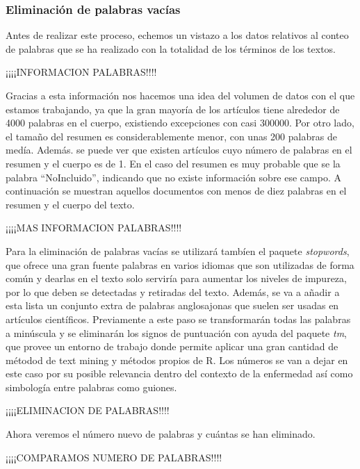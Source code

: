 \documentclass[10pt, a4paper]{article}
\begin{document}

\subsubsection{Eliminación de palabras vacías}

Antes de realizar este proceso, echemos un vistazo a los datos relativos al conteo de palabras que se ha realizado con la totalidad de los términos de los textos.

¡¡¡¡INFORMACION PALABRAS!!!!

Gracias a esta información nos hacemos una idea del volumen de datos con el que estamos trabajando, ya que la gran mayoría de los artículos tiene alrededor de 4000 palabras en el cuerpo, existiendo excepciones con casi 300000. Por otro lado, el tamaño del resumen es considerablemente menor, con unas 200 palabras de medía. Además. se puede ver que existen artículos cuyo número de palabras en el resumen y el cuerpo es de 1. En el caso del resumen es muy probable que se la palabra ``NoIncluido'', indicando que no existe información sobre ese campo. A continuación se muestran aquellos documentos con menos de diez palabras en el resumen y el cuerpo del texto.

¡¡¡¡MAS INFORMACION PALABRAS!!!!

Para la eliminación de palabras vacías se utilizará tambíen el paquete \textit{stopwords}, que ofrece una gran fuente palabras en varios idiomas que son utilizadas de forma común y dearlas en el texto solo serviría para aumentar los niveles de impureza, por lo que deben se detectadas y retiradas del texto. Además, se va a añadir a esta lista un conjunto extra de palabras anglosajonas que suelen ser usadas en artículos científicos. Previamente a este paso se transformarán todas las palabras a minúscula y se eliminarán los signos de puntuación con ayuda del paquete \textit{tm}, que provee un entorno de trabajo donde permite aplicar una gran cantidad de métodod de text mining y métodos propios de R. Los números se van a dejar en este caso por su posible relevancia dentro del contexto de la enfermedad así como simbología entre palabras como guiones. 

¡¡¡¡ELIMINACION DE PALABRAS!!!!

Ahora veremos el número nuevo de palabras y cuántas se han eliminado.

¡¡¡¡COMPARAMOS NUMERO DE PALABRAS!!!!
\end{document}
